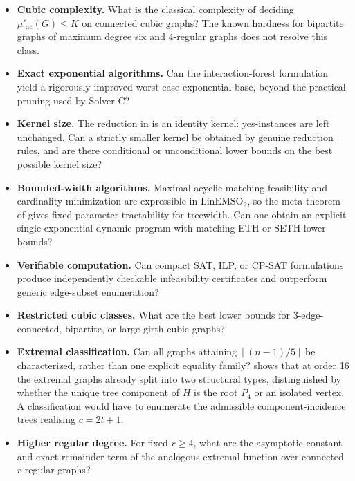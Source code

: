 \documentclass[smallextended,natbib,nospthms]{svjour3}
\theoremstyle{definition}
\theoremstyle{remark}
\newcommand{\acnum}{\mu'_{\mathrm{ac}}}
\newcommand{\ceil}[1]{\left\lceil #1\right\rceil}
\begin{document}
\begin{itemize}[leftmargin=1.5em]
  \item \textbf{Cubic complexity.}
  What is the classical complexity of deciding $\acnum(G)\leq K$ on connected
  cubic graphs? The known hardness for bipartite graphs of maximum degree six
  and 4-regular graphs does not resolve this class.

  \item \textbf{Exact exponential algorithms.}
  Can the interaction-forest formulation yield a rigorously improved
  worst-case exponential base, beyond the practical pruning used by Solver C?

  \item \textbf{Kernel size.}
  The reduction in  is an identity kernel: yes-instances are
  left unchanged. Can a strictly smaller kernel be obtained by genuine
  reduction rules, and are there conditional or unconditional lower bounds on
  the best possible kernel size?

  \item \textbf{Bounded-width algorithms.}
  Maximal acyclic matching feasibility and cardinality minimization are
  expressible in $\mathrm{LinEMSO}_2$, so the meta-theorem of
  \citet{Arnborg1991} gives fixed-parameter tractability for treewidth. Can one
  obtain an explicit single-exponential dynamic program with matching ETH or
  SETH lower bounds?

  \item \textbf{Verifiable computation.}
  Can compact SAT, ILP, or CP-SAT formulations produce independently
  checkable infeasibility certificates and outperform generic edge-subset
  enumeration?

  \item \textbf{Restricted cubic classes.}
  What are the best lower bounds for 3-edge-connected, bipartite, or
  large-girth cubic graphs?

  \item \textbf{Extremal classification.}
  Can all graphs attaining $\ceil{(n-1)/5}$ be characterized, rather than one
  explicit equality family?  shows that at order 16
  the extremal graphs already split into two structural types, distinguished
  by whether the unique tree component of $H$ is the root $P_4$ or an isolated
  vertex. A classification would have to enumerate the admissible
  component-incidence trees realising $c=2t+1$.

  \item \textbf{Higher regular degree.}
  For fixed $r\geq 4$, what are the asymptotic constant and exact remainder
  term of the analogous extremal function over connected $r$-regular graphs?
\end{itemize}
\end{document}
